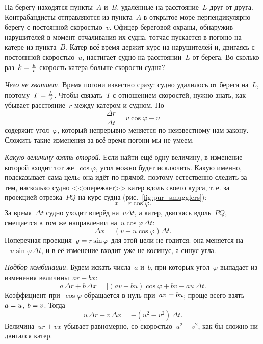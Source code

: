 \documentclass[../main.tex]{subfiles}
\begin{document}
\begin{example}
На берегу находятся пункты~$A$ и~$B$, удалённые на расстояние~$L$ друг от друга.
Контрабандисты отправляются из пункта~$A$ в открытое море перпендикулярно берегу с
постоянной скоростью~$v$. Офицер береговой охраны, обнаружив нарушителей в момент
отчаливания их судна, тотчас пускается в погоню на катере из пункта~$B$. Катер всё
время держит курс на нарушителей и, двигаясь с постоянной скоростью~$u$, настигает
судно на расстоянии~$L$ от берега. Во сколько раз~$k \hm= \frac{u}{v}$ скорость катера
больше скорости судна?\label{ex:pur_smugglers}


\noindent\textit{Чего не хватает.} Время погони известно сразу: судно удалилось от
берега на~$L$, поэтому~$T \hm= \frac{L}{v}$. Чтобы связать~$T$ с отношением скоростей,
нужно знать, как убывает расстояние~$r$ между катером и судном. Но
\[
\frac{\Delta r}{\Delta t} = v\cos\varphi - u
\]
содержит угол~$\varphi$, который непрерывно меняется по неизвестному нам закону.
Сложить такие изменения за всё время погони мы не умеем.

\noindent\textit{Какую величину взять второй.} Если найти ещё одну величину, в
изменение которой входит тот же~$\cos\varphi$, угол можно будет исключить. Какую
именно, подсказывает сама цель: она идёт по прямой, поэтому естественно следить за
тем, насколько судно <<опережает>> катер вдоль своего курса, т.\,е. за проекцией
отрезка~$PQ$ на курс судна (рис.~\ref{fig:pur_smugglers}):
\[
x = r\cos\varphi.
\]
За время~$\Delta t$ судно уходит вперёд на~$v\Delta t$, а катер, двигаясь вдоль~$PQ$,
смещается в том же направлении на~$u\cos\varphi\,\Delta t$:
\[
\Delta x = (v - u\cos\varphi)\Delta t.
\]
Поперечная проекция~$y \hm= r\sin\varphi$ для этой цели не годится: она меняется на~$-u\sin\varphi\,\Delta t$, и в её изменение входит уже не косинус, а синус угла.

\noindent\textit{Подбор комбинации.} Будем искать числа~$a$ и~$b$, при которых угол~$\varphi$ выпадает из изменения величины~$ar + bx$:
\[
a\,\Delta r + b\,\Delta x = \bigl[(av - bu)\cos\varphi + bv - au\bigr]\Delta t.
\]
Коэффициент при~$\cos\varphi$ обращается в нуль при~$av \hm= bu$; проще всего взять~$a \hm= u$, $b \hm= v$. Тогда
\[
u\,\Delta r + v\,\Delta x = -(u^2 - v^2)\,\Delta t.
\]
Величина~$ur + vx$ убывает равномерно, со скоростью~$u^2 - v^2$, как бы сложно ни
двигался катер.


\end{example}
\end{document}
